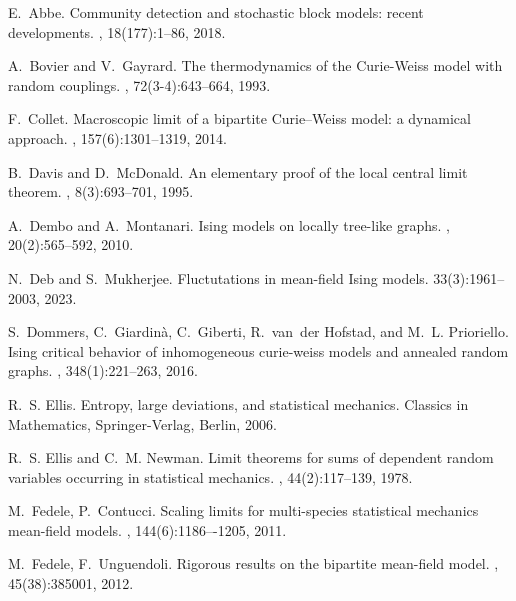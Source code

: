 \documentclass[11pt,oneside]{amsart}
\numberwithin{equation}{section}  %
\theoremstyle{plain}
\theoremstyle{remark}
\begin{document}
\begin{thebibliography}{}

E.~Abbe. 
\newblock Community detection and stochastic block models: recent developments.
, 18(177):1--86, 2018.

A.~Bovier and V.~Gayrard.
\newblock The thermodynamics of the {C}urie-{W}eiss model with random
  couplings.
, 72(3-4):643--664, 1993.

F.~Collet.
\newblock 
Macroscopic limit of a bipartite Curie–Weiss model: a dynamical approach. 
, 157(6):1301--1319, 2014.

B.~Davis and D.~McDonald.
\newblock An elementary proof of the local central limit theorem.
, 8(3):693--701, 1995.

A.~Dembo and A.~Montanari.
\newblock Ising models on locally tree-like graphs.
, 20(2):565--592, 2010.

N.~Deb and S.~Mukherjee.
\newblock Fluctutations in mean-field Ising models.
 33(3):1961--2003, 2023.

S.~Dommers, C.~Giardin{\`a}, C.~Giberti, R.~van~der Hofstad, and M.~L.
  Prioriello.
\newblock Ising critical behavior of inhomogeneous curie-weiss models and
  annealed random graphs.
, 348(1):221--263, 2016.

R.~S. Ellis.
\newblock Entropy, large deviations, and statistical mechanics. Classics in Mathematics, Springer-Verlag, Berlin, 2006.


R.~S. Ellis and C.~M. Newman.
\newblock Limit theorems for sums of dependent random variables occurring in
  statistical mechanics.
, 44(2):117--139, 1978.

M.~Fedele, P.~Contucci. 
\newblock Scaling limits for multi-species statistical mechanics mean-field models. 
, 144(6):1186–-1205, 2011.

M.~Fedele, F.~Unguendoli.
\newblock Rigorous results on the bipartite mean-field model. 
, 45(38):385001, 2012.


\end{thebibliography}
\end{document}
